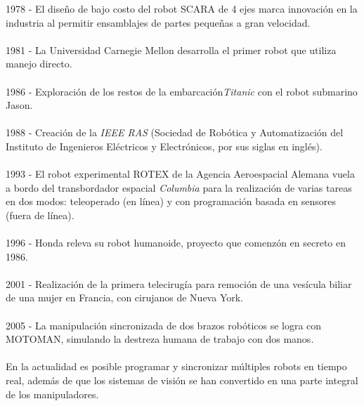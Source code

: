 1978 - El diseño de bajo costo del robot SCARA de 4 ejes marca innovación en la industria al permitir ensamblajes de partes pequeñas a gran velocidad.\\\\
1981 - La Universidad Carnegie Mellon desarrolla el primer robot que utiliza manejo directo.\\\\
1986 - Exploración de los restos de la embarcación\textit{Titanic} con el robot submarino Jason.\\\\
1988 - Creación de la \textit{IEEE RAS} (Sociedad de Robótica y Automatización del Instituto de Ingenieros Eléctricos y Electrónicos, por sus siglas en inglés).\\\\
1993 - El robot experimental ROTEX de la Agencia Aeroespacial Alemana vuela a bordo del transbordador espacial \textit{Columbia} para la realización de varias tareas en dos modos: teleoperado (en línea) y con programación basada en sensores (fuera de línea).\\\\
1996 - Honda releva su robot humanoide, proyecto que comenzón en secreto en 1986.\\\\
2001 - Realización de la primera telecirugía para remoción de una vesícula biliar de una mujer en Francia, con cirujanos de Nueva York.\\\\
2005 - La manipulación sincronizada de dos brazos robóticos se logra con MOTOMAN, simulando la destreza humana de trabajo con dos manos.\\\\
En la actualidad es posible programar y sincronizar múltiples robots en tiempo real, además de que los sistemas de visión se han convertido en una parte integral de los manipuladores.
